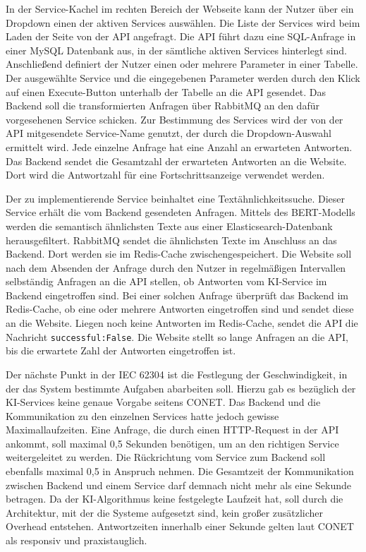 In der Service-Kachel im rechten Bereich der Webseite kann der Nutzer über ein Dropdown einen der aktiven Services auswählen. Die Liste der Services wird beim Laden der Seite von der API angefragt. Die API führt dazu eine SQL-Anfrage in einer MySQL Datenbank aus, in der sämtliche aktiven Services hinterlegt sind. Anschließend definiert der Nutzer einen oder mehrere Parameter in einer Tabelle. Der ausgewählte Service und die eingegebenen Parameter werden durch den Klick auf einen Execute-Button unterhalb der Tabelle an die API gesendet. Das Backend soll die transformierten Anfragen über RabbitMQ an den dafür vorgesehenen Service schicken. Zur Bestimmung des Services wird der von der API mitgesendete Service-Name genutzt, der durch die Dropdown-Auswahl ermittelt wird. Jede einzelne Anfrage hat eine Anzahl an erwarteten Antworten. Das Backend sendet die Gesamtzahl der erwarteten Antworten an die Website. Dort wird die Antwortzahl für eine Fortschrittsanzeige verwendet werden.

Der zu implementierende Service beinhaltet eine Textähnlichkeitssuche. Dieser Service erhält die vom Backend gesendeten Anfragen. Mittels des BERT-Modells werden die semantisch ähnlichsten Texte aus einer Elasticsearch-Datenbank herausgefiltert. RabbitMQ sendet die ähnlichsten Texte im Anschluss an das Backend. Dort werden sie im Redis-Cache zwischengespeichert. Die Website soll nach dem Absenden der Anfrage durch den Nutzer in regelmäßigen Intervallen selbständig Anfragen an die API stellen, ob Antworten vom KI-Service im Backend eingetroffen sind. Bei einer solchen Anfrage überprüft das Backend im Redis-Cache, ob eine oder mehrere Antworten eingetroffen sind und sendet diese an die Website. Liegen noch keine Antworten im Redis-Cache, sendet die API die Nachricht \texttt{successful:False}. Die Website stellt so lange Anfragen an die API, bis die erwartete Zahl der Antworten eingetroffen ist.

Der nächste Punkt in der IEC 62304 ist die Festlegung der Geschwindigkeit, in der das System bestimmte Aufgaben abarbeiten soll. Hierzu gab es bezüglich der KI-Services keine genaue Vorgabe seitens CONET. Das Backend und die Kommunikation zu den einzelnen Services hatte jedoch gewisse Maximallaufzeiten. Eine Anfrage, die durch einen HTTP-Request in der API ankommt, soll maximal 0,5 Sekunden benötigen, um an den richtigen Service weitergeleitet zu werden. Die Rückrichtung vom Service zum Backend soll ebenfalls maximal 0,5 in Anspruch nehmen. Die Gesamtzeit der Kommunikation zwischen Backend und einem Service darf demnach nicht mehr als eine Sekunde betragen. Da der KI-Algorithmus keine festgelegte Laufzeit hat, soll durch die Architektur, mit der die Systeme aufgesetzt sind, kein großer zusätzlicher Overhead entstehen. Antwortzeiten innerhalb einer Sekunde gelten laut CONET als responsiv und praxistauglich.

